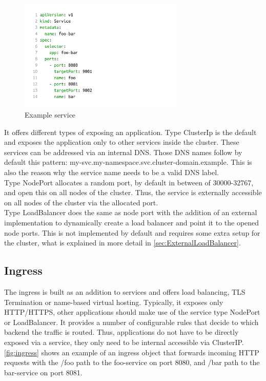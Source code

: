 \begin{figure}[H]
    \centering
    \includegraphics[width=0.7\textwidth, left]{media/02/service}
    \caption{Example service}
    \label{fig:service}
\end{figure}

It offers different types of exposing an application.
Type ClusterIp is the default and exposes the application only to other services inside the cluster.
These services can be addressed via an internal DNS.
Those DNS names follow by default this pattern: my-svc.my-namespace.svc.cluster-domain.example.
This is also the reason why the service name needs to be a valid DNS label.
\\
Type NodePort allocates a random port, by default in between of 30000-32767, and open this on all nodes of the cluster.
Thus, the service is externally accessible on all nodes of the cluster via the allocated port.
\\
Type LoadBalancer does the same as node port with the addition of an external implementation to dynamically create a load balancer and point it to the opened node ports.
This is not implemented by default and requires some extra setup for the cluster, what is explained in more detail in \autoref{sec:ExternalLoadBalancer}.~\cite{KUBERNETES-SERVICE}

\subsection{Ingress}\label{subsec:ingress}
The ingress is built as an addition to services and offers load balancing, TLS Termination or name-based virtual hosting.
Typically, it exposes only HTTP/HTTPS, other applications should make use of the service type NodePort or LoadBalancer.
It provides a number of configurable rules that decide to which backend the traffic is routed.
Thus, applications do not have to be directly exposed via a service, they only need to be internal accessible via ClusterIP.~\cite{KUBERNETES-INGRESS}
\autoref{fig:ingress} shows an example of an ingress object that forwards incoming HTTP requests with the /foo path to the foo-service on port 8080, and /bar path to the bar-service on port 8081.

